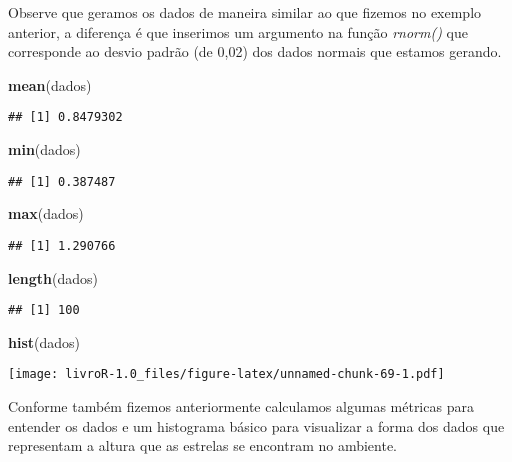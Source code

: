 \documentclass[]{book}
\newenvironment{Shaded}{\begin{snugshade}}{\end{snugshade}}
\newcommand{\KeywordTok}[1]{\textcolor[rgb]{0.13,0.29,0.53}{\textbf{#1}}}
\newcommand{\NormalTok}[1]{#1}
\begin{document}
Observe que geramos os dados de maneira similar ao que fizemos no exemplo anterior, a diferença é que inserimos um argumento na função \emph{rnorm()} que corresponde ao desvio padrão (de 0,02) dos dados normais que estamos gerando.

\begin{Shaded}
\begin{Highlighting}[]
\KeywordTok{mean}\NormalTok{(dados)}
\end{Highlighting}
\end{Shaded}

\begin{verbatim}
## [1] 0.8479302
\end{verbatim}

\begin{Shaded}
\begin{Highlighting}[]
\KeywordTok{min}\NormalTok{(dados)}
\end{Highlighting}
\end{Shaded}

\begin{verbatim}
## [1] 0.387487
\end{verbatim}

\begin{Shaded}
\begin{Highlighting}[]
\KeywordTok{max}\NormalTok{(dados)}
\end{Highlighting}
\end{Shaded}

\begin{verbatim}
## [1] 1.290766
\end{verbatim}

\begin{Shaded}
\begin{Highlighting}[]
\KeywordTok{length}\NormalTok{(dados)}
\end{Highlighting}
\end{Shaded}

\begin{verbatim}
## [1] 100
\end{verbatim}

\begin{Shaded}
\begin{Highlighting}[]
\KeywordTok{hist}\NormalTok{(dados)}
\end{Highlighting}
\end{Shaded}

\texttt{[image: livroR-1.0\_files/figure-latex/unnamed-chunk-69-1.pdf]}

Conforme também fizemos anteriormente calculamos algumas métricas para entender os dados e um histograma básico para visualizar a forma dos dados que representam a altura que as estrelas se encontram no ambiente.
\end{document}

